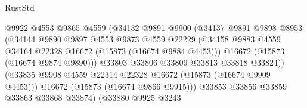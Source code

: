 \begin{lexlean}{RustStd}
\begin{coremodule}
                                        @9922
                                        @4553
                                        @9865
                                        @4559
                                        (@34132
                                          @9891
                                          @9900
                                          (@34137
                                            @9891
                                            @9898
                                            @8953
                                            (@34144
                                              @9890
                                              @9897
                                              @4553
                                              @9873
                                              @4559
                                              @22229
                                              (@34158
                                                @9883
                                                @4559
                                                @34164
                                                @22328
                                                @16672
                                                (@15873 (@16674 @9884 @4453)))
                                              @16672
                                              (@15873 (@16674 @9874 @9890)))
                                            @33803
                                            @33806
                                            @33809
                                            @33813
                                            @33818
                                            @33824))
                                        (@33835
                                          @9908
                                          @4559
                                          @22314
                                          @22328
                                          @16672
                                          (@15873 (@16674 @9909 @4453)))
                                        @16672
                                        (@15873 (@16674 @9866 @9915)))
                                      @33853
                                      @33856
                                      @33859
                                      @33863
                                      @33868
                                      @33874)
                                    (@33880
                                      @9925
                                      @3243

\end{coremodule}
\end{lexlean}
